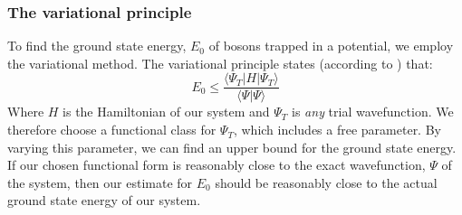 \documentclass[a4paper, 10pt]{article}
\begin{document}
	\subsubsection{The variational principle}
	To find the ground state energy, $E_0$ of bosons trapped in a potential, we employ the variational method. The variational principle states (according to \cite{Griffiths2004}) that:
	\begin{equation}\label{eq:Variational_principle}
	E_0\leq  \frac{\langle \Psi_T |H|\Psi_T \rangle}{\langle \Psi|\Psi\rangle}
	\end{equation}
	Where $H$ is the Hamiltonian of our system and $\Psi_T$ is \textit{any} trial wavefunction. We therefore choose a functional class for $\Psi_T$, which includes a free parameter. By varying this parameter, we can find an upper bound for the ground state energy. If our chosen functional form is reasonably close to the exact wavefunction, $\Psi$ of the system, then our estimate for $E_0$ should be reasonably close to the actual ground state energy of our system.
\end{document}

